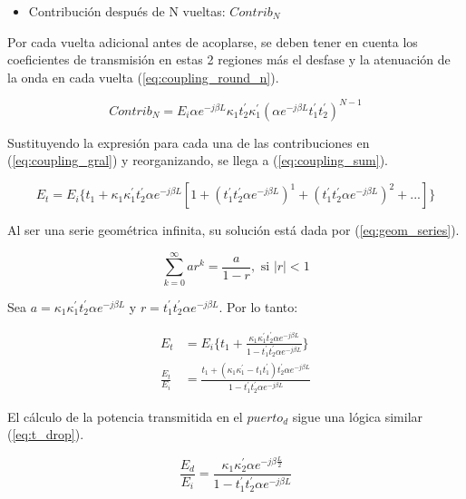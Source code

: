 \begin{itemize}
\item Contribución después de N vueltas: $Contrib_N$
\end{itemize} 

Por cada vuelta adicional antes de acoplarse, se deben tener en cuenta los 
coeficientes de transmisión en estas 2 regiones más el desfase y la atenuación de la 
onda en cada vuelta (\ref{eq:coupling_round_n}).

\begin{equation}
Contrib_N = E_i \alpha e^{-j \beta L} \kappa_1 t_2^{'} \kappa_1^{'} (\alpha e^{-j \beta L} t_1^{'} t_2^{'})^{N-1}
\label{eq:coupling_round_n}
\end{equation} 

Sustituyendo la expresión para cada una de las contribuciones en 
(\ref{eq:coupling_gral}) y reorganizando, se llega a (\ref{eq:coupling_sum}).


\begin{equation}
E_t = E_i\{
t_1+
\kappa_1\kappa_1^{'} t_2^{'} \alpha e^{-j \beta L} [
1 +
(t_1^{'} t_2^{'} \alpha e^{-j \beta L})^1 +
(t_1^{'} t_2^{'} \alpha e^{-j \beta L})^2 +
...]\}
\label{eq:coupling_sum}
\end{equation}

Al ser una serie geométrica infinita, su solución está dada por (\ref{eq:geom_series}).

\begin{equation}
\sum\limits_{k = 0}^\infty {ar^{k} = \frac{a}{{1 - r}}}, \text{ si } |r| < 1
\label{eq:geom_series}
\end{equation} 

Sea 
$a = \kappa_1 \kappa_1^{'} t_2^{'} \alpha e^{-j \beta L} $ y  
$r = t_1^{'} t_2^{'} \alpha e^{-j \beta L}$.
Por lo tanto:

\begin{align}
E_t &= E_i\{t_1 + 
\frac{ \kappa_1 \kappa_1^{'} t_2^{'} \alpha e^{-j \beta L}}
{1 - t_1^{'} t_2^{'} \alpha e^{-j \beta L}} \} \\
\frac{E_t}{E_i} &= 
    \frac{t_1 + (\kappa_1 \kappa_1^{'} - t_1 t_1^{'})t_2^{'} \alpha e^{-j \beta L}}
    {1 - t_1^{'} t_2^{'} \alpha e^{-j \beta L}}
\label{eq:t_through}
\end{align} 

El cálculo de la potencia transmitida en el $puerto_d$ sigue una
lógica similar (\ref{eq:t_drop}).

\begin{equation}
\frac{E_d}{E_i} = \frac{ \kappa_1 \kappa_2^{'} \alpha e^{ -j \beta \frac{L}{2}} }
	   { 1 - t_1^{'} t_2^{'} \alpha e^{-j \beta L} }
\label{eq:t_drop}
\end{equation} 

